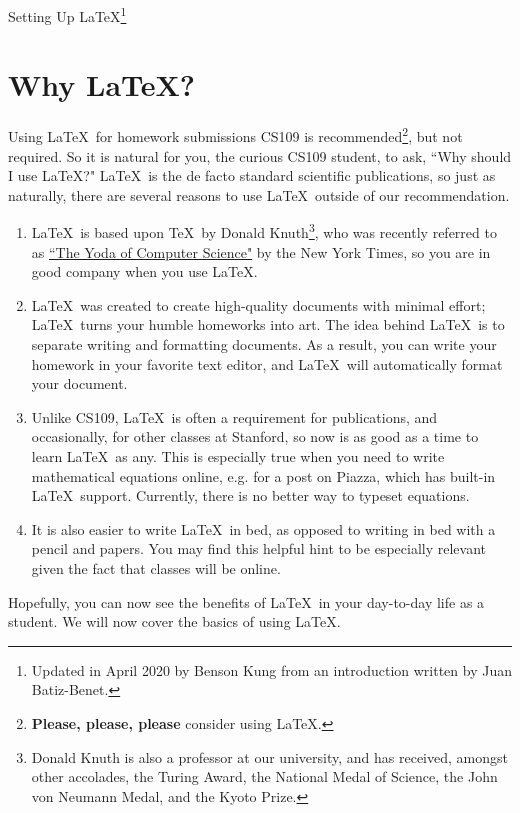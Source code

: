 \documentclass[11pt]{article}
\begin{document}
\begin{center}
\huge{Setting Up \LaTeX}\footnote{Updated in April 2020 by Benson Kung from an introduction written by Juan Batiz-Benet.}
\end{center}

\section*{Why \LaTeX?}
Using \LaTeX\ for homework submissions CS109 is recommended\footnote{\textbf{Please, please, please} consider using \LaTeX.}, but not required.
So it is natural for you, the curious CS109 student, to ask, ``Why should I use \LaTeX?"
\LaTeX\ is the de facto standard scientific publications, so just as naturally, there are several reasons to use \LaTeX\ outside of our recommendation.
\begin{enumerate}
    \item \LaTeX\ is based upon \TeX\ by Donald Knuth\footnote{Donald Knuth is also a professor at our university, and has received, amongst other accolades, the Turing Award, the National Medal of Science, the John von Neumann Medal, and the Kyoto Prize.}, who was recently referred to as \href{https://www.nytimes.com/2018/12/17/science/donald-knuth-computers-algorithms-programming.html}{``The Yoda of Computer Science"} by the New York Times, so you are in good company when you use \LaTeX. 
    \item \LaTeX\ was created to create high-quality documents with minimal effort; \LaTeX\ turns your humble homeworks into art. The idea behind \LaTeX\ is to separate writing and formatting documents. As a result, you can write your homework in your favorite text editor, and \LaTeX\ will automatically format your document. 
    \item Unlike CS109, \LaTeX\ is often a requirement for publications, and occasionally, for other classes at Stanford, so now is as good as a time to learn \LaTeX\ as any. This is especially true when you need to write mathematical equations online, e.g. for a post on Piazza, which has built-in \LaTeX\ support. Currently, there is no better way to typeset equations.
    \item It is also easier to write \LaTeX\ in bed, as opposed to writing in bed with a pencil and papers. You may find this helpful hint to be especially relevant given the fact that classes will be online. 
\end{enumerate}
Hopefully, you can now see the benefits of \LaTeX\ in your day-to-day life as a student.
We will now cover the basics of using \LaTeX.
\end{document}
